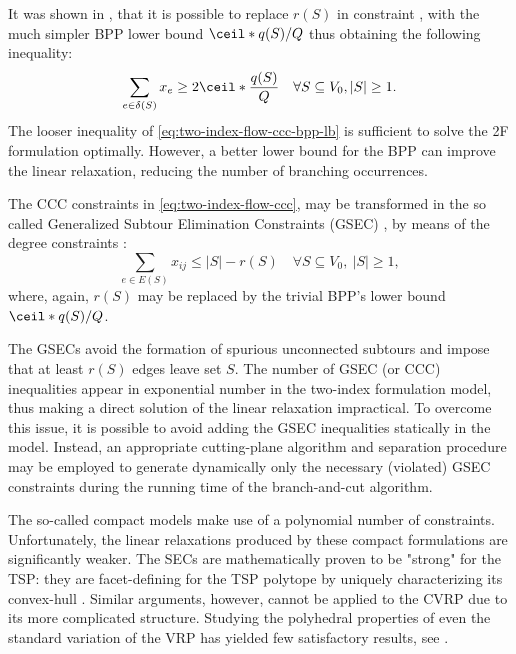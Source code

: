 It was shown in \textcite{martello1990knapsack, cornuejols1993}, that it is possible to replace $r(S)$ in constraint
, with the much simpler BPP lower bound $\ceil*{q(S) / Q}$
thus obtaining the following inequality:
\begin{equation}
	\label{eq:two-index-flow-ccc-bpp-lb}
	\sum_{e \in \delta(S)} x_e \ge 2 \ceil*{\frac{q(S)}{Q}}   \quad \forall S \subseteq V_0, |S| \ge 1.
\end{equation}
The looser inequality of \cref{eq:two-index-flow-ccc-bpp-lb} is sufficient
to solve the 2F formulation optimally.
However, a better lower bound for the BPP
can improve the linear relaxation, reducing the number of branching occurrences.

The CCC constraints in \cref{eq:two-index-flow-ccc},
may be transformed in the so called Generalized Subtour Elimination Constraints (GSEC) \parencite{laporte1985},
by means of the degree constraints :
\begin{equation}\label{eq:cvrp-2flow-gsec}
	\sum_{e \in E(S)} x_{ij} \le |S| - r(S) \quad \forall S \subseteq V_0,\ |S| \ge 1,
\end{equation}
where, again, $r(S)$ may be replaced by the trivial BPP's lower bound $\ceil*{q(S) / Q}$.

The GSECs avoid the formation of spurious unconnected subtours and impose that at least $r(S)$ edges leave set $S$.
The number of GSEC (or CCC) inequalities appear in exponential number in the two-index formulation model,
thus making a direct solution of the linear relaxation impractical.
To overcome this issue, it is possible to avoid adding the GSEC inequalities statically in the model.
Instead, an appropriate cutting-plane algorithm and separation procedure may be employed to generate dynamically
only the necessary (violated) GSEC constraints
during the running time of the branch-and-cut algorithm.

The so-called compact models \parencite{miller1960, christofides1979vehicle, desrochers1991}
make use of a polynomial number of constraints.
Unfortunately, the linear relaxations produced by these compact formulations are significantly weaker.
The SECs are mathematically proven to be "strong" for the TSP:
they are facet-defining for the TSP polytope by uniquely characterizing its convex-hull \parencite{grotschel1975}.
Similar arguments, however, cannot be applied to the CVRP due to its more complicated structure.
Studying the polyhedral properties of even the standard variation of the VRP
has yielded few satisfactory results, see \textcite{campos1991, cornuejols1993}.

